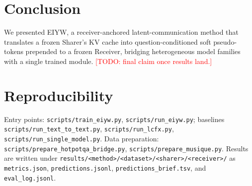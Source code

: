 \documentclass[11pt]{article}
\newcommand{\method}{\textsc{EIYW}\xspace}      %
\newcommand{\sharer}{\textsf{Sharer}\xspace}
\newcommand{\receiver}{\textsf{Receiver}\xspace}
\newcommand{\TODO}[1]{\textcolor{red}{[TODO: #1]}}
\begin{document}
\section{Conclusion}
We presented \method, a receiver-anchored latent-communication method that
translates a frozen \sharer's KV cache into question-conditioned soft
pseudo-tokens prepended to a frozen \receiver, bridging heterogeneous model
families with a single trained module. \TODO{final claim once results land.}

\appendix
\section{Reproducibility}
Entry points: \texttt{scripts/train\_eiyw.py}, \texttt{scripts/run\_eiyw.py};
baselines \texttt{scripts/run\_text\_to\_text.py}, \texttt{scripts/run\_lcfx.py},
\texttt{scripts/run\_single\_model.py}. Data preparation:
\texttt{scripts/prepare\_hotpotqa\_bridge.py},
\texttt{scripts/prepare\_musique.py}. Results are written under
\texttt{results/<method>/<dataset>/<sharer>/<receiver>/} as
\texttt{metrics.json}, \texttt{predictions.jsonl},
\texttt{predictions\_brief.tsv}, and \texttt{eval\_log.jsonl}.
\end{document}
